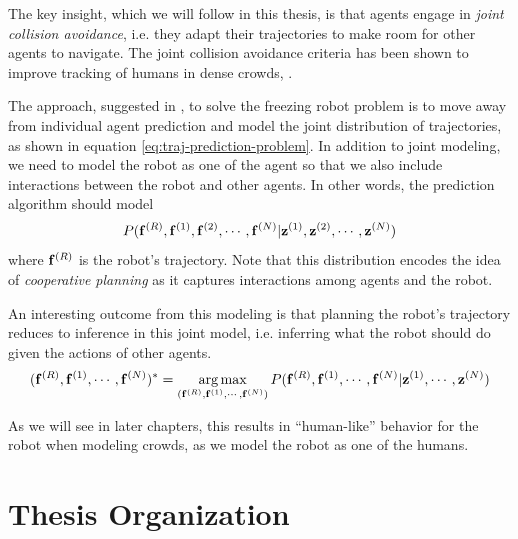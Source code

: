 The key insight, which we will follow in this thesis, is that agents engage in \textit{joint collision avoidance}, i.e. they adapt their trajectories to make room for other agents to navigate. The joint collision avoidance criteria has been shown to improve tracking of humans in dense crowds, \cite{pellegrini09, trautman10, trautman13, trautman15}.

The approach, suggested in \cite{trautman10}, to solve the freezing robot problem is to move away from individual agent prediction and model the joint distribution of trajectories, as shown in equation \ref{eq:traj-prediction-problem}. In addition to joint modeling, we need to model the robot as one of the agent so that we also include interactions between the robot and other agents. In other words, the prediction algorithm should model
\begin{equation}
  \label{eq:freeze}
  P(\mathbf{f}^{(R)}, \mathbf{f}^{(1)}, \mathbf{f}^{(2)}, \cdots, \mathbf{f}^{(N)} | \mathbf{z}^{(1)}, \mathbf{z}^{(2)}, \cdots, \mathbf{z}^{(N)})
\end{equation}
where $\mathbf{f}^{(R)}$ is the robot's trajectory. Note that this distribution encodes the idea of \textit{cooperative planning} as it captures interactions among agents and the robot.

An interesting outcome from this modeling is that planning the robot's trajectory reduces to inference in this joint model, i.e. inferring what the robot should do given the actions of other agents.
\begin{equation}
  \label{eq:planning-reduced-to-inference}
  (\mathbf{f}^{(R)}, \mathbf{f}^{(1)}, \cdots, \mathbf{f}^{(N)})^* = \operatorname*{arg\,max}_{(\mathbf{f}^{(R)}, \mathbf{f}^{(1)}, \cdots, \mathbf{f}^{(N)})} P(\mathbf{f}^{(R)}, \mathbf{f}^{(1)}, \cdots, \mathbf{f}^{(N)} | \mathbf{z}^{(1)}, \cdots, \mathbf{z}^{(N)})
\end{equation}

As we will see in later chapters, this results in ``human-like'' behavior for the robot when modeling crowds, as we model the robot as one of the humans. 


\section{Thesis Organization}
\label{sec:intro-thesis-organization}

